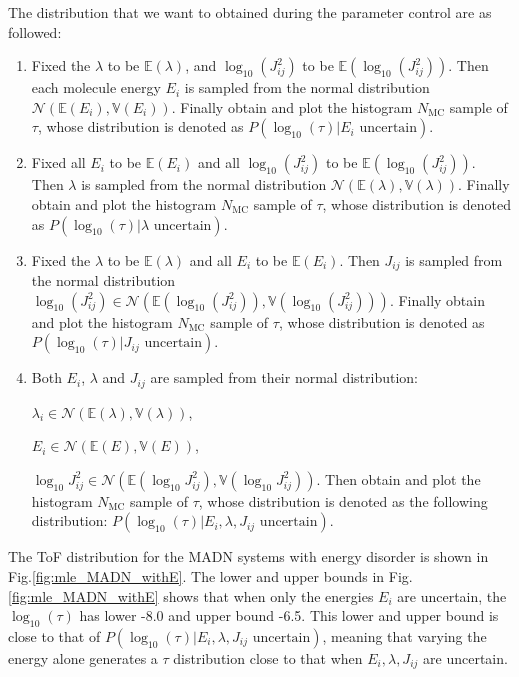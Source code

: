 \documentclass[%
 reprint,
superscriptaddress,
 amsmath,amssymb,
 aps,
prb,
floatfix
]{revtex4-2}
\begin{document}
The distribution that we want to obtained during the parameter control are as followed:
\begin{enumerate}
    \item Fixed the $\lambda$ to be $\mathbb{E}(\lambda)$, and $\log_{10}(J_{ij}^2)$ to be $\mathbb{E}(\log_{10}(J_{ij}^2))$. Then each molecule energy $E_i$ is sampled from the normal distribution $\mathcal{N}(\mathbb{E}(E_i), \mathbb{V}(E_i))$. Finally obtain and plot the histogram $N_\text{MC}$ sample of $\tau$, whose distribution is denoted as $P(\log_{10}(\tau)|E_i \text{ uncertain})$.
    \item Fixed all $E_i$ to be $\mathbb{E}(E_i)$ and all $\log_{10}(J_{ij}^2)$ to be $\mathbb{E}(\log_{10}(J_{ij}^2))$. Then $\lambda$ is sampled from the normal distribution $\mathcal{N}(\mathbb{E}(\lambda), \mathbb{V}(\lambda))$. Finally obtain and plot the histogram  $N_\text{MC}$ sample of $\tau$, whose distribution is denoted as $P(\log_{10}(\tau)|\lambda \text{ uncertain})$. 
    \item Fixed the $\lambda$ to be $\mathbb{E}(\lambda)$ and all $E_i$ to be $\mathbb{E}(E_i)$.     Then $J_{ij}$ is sampled from the normal distribution $\log_{10}(J_{ij}^2) \in \mathcal{N}(\mathbb{E}(\log_{10}(J_{ij}^2)), \mathbb{V}(\log_{10}(J_{ij}^2)))$. Finally obtain and plot the histogram  $N_\text{MC}$ sample of $\tau$, whose distribution is denoted as $P(\log_{10}(\tau)|J_{ij} \text{ uncertain})$.
    \item Both $E_i$, $\lambda$ and $J_{ij}$ are sampled from their normal distribution:
    
    $\lambda_i \in \mathcal{N}(\mathbb{E}(\lambda), \mathbb{V}(\lambda))$, 
    
    $E_i \in \mathcal{N}(\mathbb{E}(E), \mathbb{V}(E))$, 
    
    $\log_{10}J_{ij}^2 \in \mathcal{N}(\mathbb{E}(\log_{10}J_{ij}^2), \mathbb{V}(\log_{10}J_{ij}^2))$.
    Then obtain and plot the histogram $N_\text{MC}$ sample of $\tau$, whose distribution is denoted as the following distribution: 
    $P(\log_{10}(\tau)|E_i, \lambda, J_{ij} \text{ uncertain})$.
\end{enumerate}

The ToF distribution for the MADN systems with energy disorder is shown in Fig.\ref{fig:mle_MADN_withE}.
The lower and upper bounds in Fig. \ref{fig:mle_MADN_withE} shows that when only the energies $E_i$ are uncertain, the $\log_{10}(\tau)$ has lower -8.0 and upper bound -6.5. This lower and upper bound is close to that of $P(\log_{10}(\tau)|E_i, \lambda, J_{ij} \text{ uncertain})$, meaning that varying the energy alone generates a $\tau$ distribution close to that when $E_i, \lambda, J_{ij}$ are uncertain. 
\end{document}
